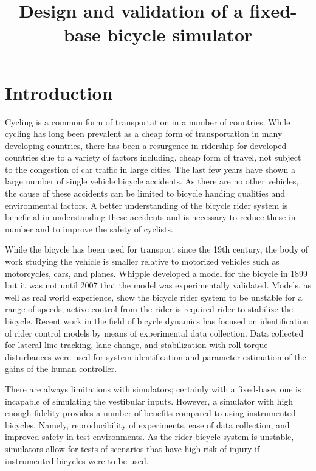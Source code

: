 \documentclass[11pt,a4paper,reqno]{amsart}
\title{Design and validation of a fixed-base bicycle simulator}
\begin{document}
\maketitle

\section{Introduction}
Cycling is a common form of transportation in a number of countries.
While cycling has long been prevalent as a cheap form of transportation in many developing countries,
there has been a resurgence in ridership for developed countries\cite{FIXME} due to a variety of factors including,
cheap form of travel, not subject to the congestion of car traffic in large cities.
The last few years have shown a large number of single vehicle bicycle accidents\cite{FIXME}.
As there are no other vehicles, the cause of these accidents can be limited to bicycle handing qualities and
environmental factors.
A better understanding of the bicycle rider system is beneficial in understanding these accidents and is necessary to
reduce these in number and to improve the safety of cyclists.

While the bicycle has been used for transport since the 19th century\cite{wilson2004}, the body of work studying the
vehicle is smaller relative to motorized vehicles such as motorcycles, cars, and planes.
Whipple developed a model for the bicycle in 1899\cite{whipple1899} but it was not until 2007 that the model was
experimentally validated\cite{kooijman2008}.
Models, as well as real world experience, show the bicycle rider system to be unstable for a range of speeds;
active control from the rider is required rider to stabilize the bicycle.
Recent work in the field of bicycle dynamics has focused on identification of rider control
models by means of experimental data collection\cite{delange2011,hess2012,hladun2015}.
Data collected for lateral line tracking\cite{delange2011,hess2012}, lane change\cite{hladun2015}, and stabilization
with roll torque disturbances\cite{delange2011,hess2012} were used for system identification and parameter estimation of
the gains of the human controller.

There are always limitations with simulators;
certainly with a fixed-base, one is incapable of simulating the vestibular inputs.
However, a simulator with high enough fidelity provides a number of benefits compared to using instrumented bicycles.
Namely, reproducibility of experiments, ease of data collection, and improved safety in test environments.
As the rider bicycle system is unstable, simulators allow for tests of scenarios that have high risk of injury if
instrumented bicycles were to be used.
\end{document}
